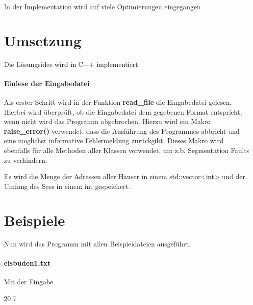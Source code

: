 \documentclass[a4paper,10pt,ngerman]{scrartcl}
\begin{document}
\medskip
In der Implementation wird auf viele Optimierungen eingegangen





















\section{Umsetzung}
Die Lösungsidee wird in C++ implementiert.

\paragraph{Einlese der Eingabedatei}
Als erster Schritt wird in der Funktion \textbf{read\_file} die Eingabedatei gelesen.
Hierbei wird überprüft, ob die Eingabedatei dem gegebenen Format entspricht, wenn nicht wird das Programm abgebrochen.
Hierzu wird ein Makro \textbf{raise\_error()} verwendet, dass die Ausführung des Programmes abbricht und eine möglichst informative Fehlermeldung zurückgibt.
Dieses Makro wird ebenfalls für alle Methoden aller Klassen verwendet, um z.b. Segmentation Faults zu verhindern.

Es wird die Menge der Adressen aller Häuser in einem std::vector<int> und der Umfang des Sees in einem int gespeichert.


\section{Beispiele}
Nun wird das Programm mit allen Beispieldateien ausgeführt.

\paragraph{eisbuden1.txt}
Mit der Eingabe

20 7
\end{document}
